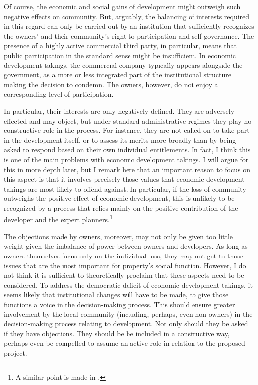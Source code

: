 Of course, the economic and social gains of development might outweigh such negative effects on community. But, arguably, the balancing of interests required in this regard can only be carried out by an institution that sufficiently recognizes the owners' and their community's right to participation and self-governance. The presence of a highly active commercial third party, in particular, means that public participation in the standard sense might be insufficient. In economic development takings, the commercial company typically appears alongside the government, as a more or less integrated part of the institutional structure making the decision to condemn. The owners, however, do not enjoy a corresponding level of participation.

In particular, their interests are only negatively defined. They are adversely effected and may object, but under standard administrative regimes they play no constructive role in the process. For instance, they are not called on to take part in the development itself, or to assess its merits more broadly than by being asked to respond based on their own individual entitlements. In fact, I think this is one of the main problems with economic development takings. I will argue for this in more depth later, but I remark here that an important reason to focus on this aspect is that it involves precisely those values that economic development takings are most likely to offend against. In particular, if the loss of community outweighs the positive effect of economic development, this is unlikely to be recognized by a process that relies mainly on the positive contribution of the developer and the expert planners.\footnote{A similar point is made in \cite{underkuffler06}.} 

The objections made by owners, moreover, may not only be given too little weight given the imbalance of power between owners and developers. As long as owners themselves focus only on the individual loss, they may not get to those issues that are the most important for property's social function. However, I do not think it is sufficient to theoretically proclaim that these aspects need to be considered. To address the democratic deficit of economic development takings, it seems likely that institutional changes will have to be made, to give those functions a voice in the decision-making process. This should ensure greater involvement by the local community (including, perhaps, even non-owners) in the decision-making process relating to development. Not only should they be asked if they have objections. They should be be included in a constructive way, perhaps even be compelled to assume an active role in relation to the proposed project.

